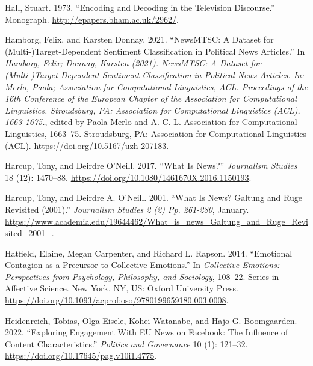 \documentclass[
]{article}
\newlength{\cslhangindent}
\newlength{\cslentryspacingunit} %
\newenvironment{CSLReferences}[2] %
 {%
  \setlength{\parindent}{0pt}
  \ifodd #1
  \let\oldpar\par
  \def\par{\hangindent=\cslhangindent\oldpar}
  \fi
  \setlength{\parskip}{#2\cslentryspacingunit}
 }%
 {}
\begin{document}
\begin{CSLReferences}{1}{0}
\leavevmode{}%
Hall, Stuart. 1973. {``Encoding and {Decoding} in the Television
Discourse.''} Monograph. \url{http://epapers.bham.ac.uk/2962/}.

\leavevmode{}%
Hamborg, Felix, and Karsten Donnay. 2021. {``{NewsMTSC}: A Dataset for
(Multi-)Target-Dependent Sentiment Classification in Political News
Articles.''} In \emph{Hamborg, {Felix}; {Donnay}, {Karsten} (2021).
{NewsMTSC}: A Dataset for (Multi-)Target-Dependent Sentiment
Classification in Political News Articles. {In}: {Merlo}, {Paola};
{Association} for {Computational} {Linguistics}, {ACL}. {Proceedings} of
the 16th {Conference} of the {European} {Chapter} of the {Association}
for {Computational} {Linguistics}. {Stroudsburg}, {PA}: {Association}
for {Computational} {Linguistics} ({ACL}), 1663-1675.}, edited by Paola
Merlo and A. C. L. Association for Computational Linguistics, 1663--75.
Stroudsburg, PA: Association for Computational Linguistics (ACL).
\url{https://doi.org/10.5167/uzh-207183}.

\leavevmode{}%
Harcup, Tony, and Deirdre O'Neill. 2017. {``What Is {News}?''}
\emph{Journalism Studies} 18 (12): 1470--88.
\url{https://doi.org/10.1080/1461670X.2016.1150193}.

\leavevmode{}%
Harcup, Tony, and Deirdre A. O'Neill. 2001. {``What Is News? {Galtung}
and {Ruge} {Revisited} (2001).''} \emph{Journalism Studies 2 (2) Pp.
261-280}, January.
\url{https://www.academia.edu/19644462/What_is_news_Galtung_and_Ruge_Revisited_2001_}.

\leavevmode{}%
Hatfield, Elaine, Megan Carpenter, and Richard L. Rapson. 2014.
{``Emotional Contagion as a Precursor to Collective Emotions.''} In
\emph{Collective Emotions: {Perspectives} from Psychology, Philosophy,
and Sociology}, 108--22. Series in Affective Science. New York, NY, US:
Oxford University Press.
\url{https://doi.org/10.1093/acprof:oso/9780199659180.003.0008}.

\leavevmode{}%
Heidenreich, Tobias, Olga Eisele, Kohei Watanabe, and Hajo G.
Boomgaarden. 2022. {``Exploring {Engagement} {With} {EU} {News} on
{Facebook}: {The} {Influence} of {Content} {Characteristics}.''}
\emph{Politics and Governance} 10 (1): 121--32.
\url{https://doi.org/10.17645/pag.v10i1.4775}.


\end{CSLReferences}
\end{document}
